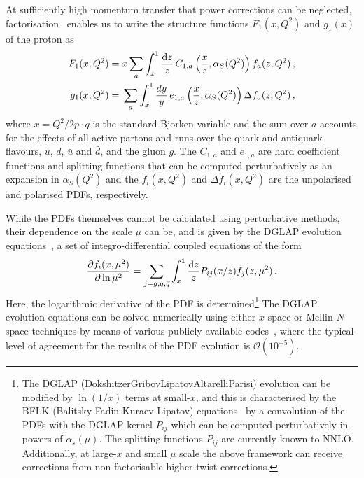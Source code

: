 At sufficiently high momentum transfer that power corrections can be neglected, factorisation~\cite{Sterman:1995fz} enables us to write the structure functions $F_1(x,Q^2)$ and $g_1(x)$ of the proton as 
\begin{align}
F_1(x,Q^2) = {} & x\sum_a \int_x^1 \frac{{\rm d}z}{z}\,C_{1,a}\left(\frac{x}{z},\alpha_S(Q^2)\right)f_a(z,Q^2) \,, \label{eq:Fi}\\
g_1(x,Q^2) = {} & \sum_a \int_x^1\frac{dy}{y}\, e_{1,a}\left(\frac{x}{z},\alpha_S(Q^2)\right) \Delta f_a(z,Q^2) \,,
\label{pdf}
\end{align}
where $x=Q^2/2p\cdot q$ is the standard Bjorken variable and the sum over $a$ accounts for the effects of all active partons and runs over the quark and antiquark flavours, $u$, $d$, $\bar{u}$ and $\bar{d}$, and the gluon $g$. The $C_{1,a}$ and $e_{1,a}$ are hard coefficient functions and splitting functions that can be computed perturbatively as an expansion in $\alpha_S(Q^2)$ and the $f_i(x,Q^2)$ and $\Delta f_i(x,Q^2)$ are the unpolarised and polarised PDFs, respectively.

While the PDFs themselves cannot be calculated using perturbative methods, their dependence on the scale $\mu$ can be, and is given by the  
DGLAP evolution equations~\cite{Dokshitzer:1977sg,Gribov:1972ri,Altarelli:1977zs},
a set of integro-differential coupled equations of the form
\begin{equation}
  \label{eq:dglap}
\frac{\partial f_i(x,\mu^2)}{\partial \ln \mu^2}=\sum_{j=g,q,\bar{q}}\int_x^1 \frac{{\rm d}z}{z}P_{ij}(x/z)f_j(z,\mu^2)\,.
\end{equation}
Here, the logarithmic derivative of the PDF is
determined\footnote{The DGLAP (Dokshitzer\textendash Gribov\textendash Lipatov\textendash Altarelli\textendash Parisi)
evolution can be modified by $\ln(1/x)$ terms at small-$x$, and
this is characterised by the BFLK (Balitsky-Fadin-Kuraev-Lipatov) equations~\cite{Kuraev:1976ge,Kuraev:1977fs,Balitsky:1978ic} by a convolution
of the PDFs with the DGLAP kernel $P_{ij}$ which can be computed
perturbatively in powers of $\alpha_{s}(\mu)$.
%
The splitting functions $P_{ij}$ are currently known to NNLO.
%
Additionally, at large-$x$ and small $\mu$ scale the above framework
can receive corrections from non-factorisable higher-twist corrections.}
%
The DGLAP evolution equations can be solved numerically using
either $x$-space or Mellin $N$-space techniques by means of various
publicly available
codes~\cite{Bertone:2013vaa,Salam:2008qg,Botje:2010ay}, where the typical level of agreement
for the results of the PDF evolution is $\mathcal{O}(10^{-5})$.

